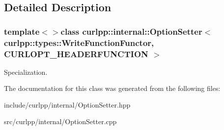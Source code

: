 \subsection{Detailed Description}
\subsubsection*{template$<$$>$class curlpp\-::internal\-::\-Option\-Setter$<$ curlpp\-::types\-::\-Write\-Function\-Functor, C\-U\-R\-L\-O\-P\-T\-\_\-\-H\-E\-A\-D\-E\-R\-F\-U\-N\-C\-T\-I\-O\-N $>$}

Specialization. 

The documentation for this class was generated from the following files\-:\begin{DoxyCompactItemize}
\item 
include/curlpp/internal/Option\-Setter.\-hpp\item 
src/curlpp/internal/Option\-Setter.\-cpp\end{DoxyCompactItemize}
